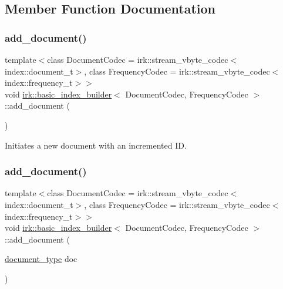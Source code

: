 \subsection{Member Function Documentation}
\mbox{\label{classirk_1_1basic__index__builder_a1259cef9edadcf01b310dc7bbfae366d}} 
\subsubsection{\texorpdfstring{add\+\_\+document()}{add\_document()}\hspace{0.1cm}{\footnotesize\ttfamily [1/2]}}
{\footnotesize\ttfamily template$<$class Document\+Codec  = irk\+::stream\+\_\+vbyte\+\_\+codec$<$index\+::document\+\_\+t$>$, class Frequency\+Codec  = irk\+::stream\+\_\+vbyte\+\_\+codec$<$index\+::frequency\+\_\+t$>$$>$ \\
void \mbox{\hyperlink{classirk_1_1basic__index__builder}{irk\+::basic\+\_\+index\+\_\+builder}}$<$ Document\+Codec, Frequency\+Codec $>$\+::add\+\_\+document (\begin{DoxyParamCaption}{ }\end{DoxyParamCaption})\hspace{0.3cm}{\ttfamily [inline]}}



Initiates a new document with an incremented ID. 

\mbox{\label{classirk_1_1basic__index__builder_acbaea2f2be4a4210d126d904277a8206}} 
\subsubsection{\texorpdfstring{add\+\_\+document()}{add\_document()}\hspace{0.1cm}{\footnotesize\ttfamily [2/2]}}
{\footnotesize\ttfamily template$<$class Document\+Codec  = irk\+::stream\+\_\+vbyte\+\_\+codec$<$index\+::document\+\_\+t$>$, class Frequency\+Codec  = irk\+::stream\+\_\+vbyte\+\_\+codec$<$index\+::frequency\+\_\+t$>$$>$ \\
void \mbox{\hyperlink{classirk_1_1basic__index__builder}{irk\+::basic\+\_\+index\+\_\+builder}}$<$ Document\+Codec, Frequency\+Codec $>$\+::add\+\_\+document (\begin{DoxyParamCaption}\item[{\mbox{\hyperlink{classirk_1_1basic__index__builder_a757a96c8851f4aeee2014a74f60b183e}{document\+\_\+type}}}]{doc }\end{DoxyParamCaption})\hspace{0.3cm}{\ttfamily [inline]}}



